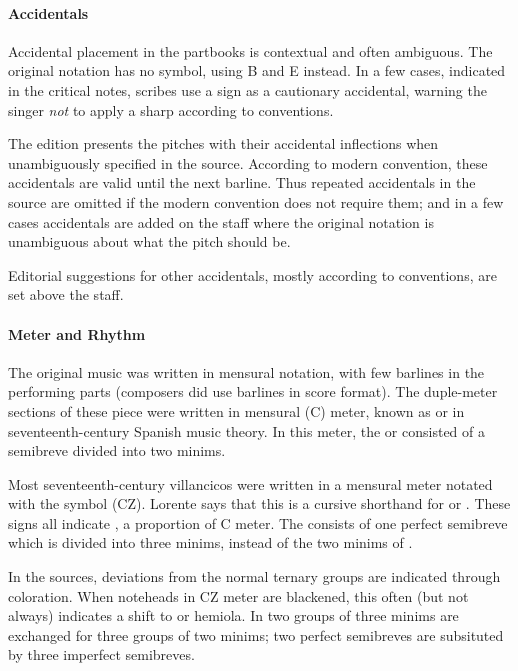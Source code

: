 \paragraph{Accidentals}
Accidental placement in the partbooks is contextual and often ambiguous.
The original notation has no \na{} symbol, using B\sh{} and E\sh{} instead.
In a few cases, indicated in the critical notes, scribes use a \sh{} sign as a cautionary accidental, warning the singer \emph{not} to apply a sharp according to  conventions.%
  \autocites{Harran:Cautionary1}{Harran:Cautionary2}

The edition presents the pitches with their accidental inflections when unambiguously specified in the source.
According to modern convention, these accidentals are valid until the next barline.
Thus repeated accidentals in the source are omitted if the modern convention does not require them; and in a few cases accidentals are added on the staff where the original notation is unambiguous about what the pitch should be.

Editorial suggestions for other accidentals, mostly according to  conventions, are set above the staff.

\paragraph{Meter and Rhythm}
The original music was written in mensural notation, with few barlines in the performing parts (composers did use barlines in score format). 
The duple-meter sections of these piece were written in mensural \meterC{} (C) meter, known as  or  in seventeenth-century Spanish music theory.%
  \autocites[537]{Cerone:Melopeo}[156, 210]{Lorente:Porque}
  {GonzalezValle:CompasCabezon}{GonzalezValle:MusicaTexto}
In this meter, the  or  consisted of a semibreve divided into two minims.

Most seventeenth-century villancicos were written in a mensural meter notated with the symbol \meterCZ{} (CZ).
Lorente says that this is a cursive shorthand for \meterCThree or \meterCThreeTwo{}.%
  \autocite[165]{Lorente:Porque}
These signs all indicate , a proportion of C meter.
The  consists of one perfect semibreve which is divided into three minims, instead of the two minims of \meterC.

In the sources, deviations from the normal ternary groups are indicated through coloration. 
When noteheads in CZ meter are blackened, this often (but not always) indicates a shift to  or hemiola.
In  two groups of three minims are exchanged for three groups of two minims; two perfect semibreves are subsituted by three imperfect semibreves.

